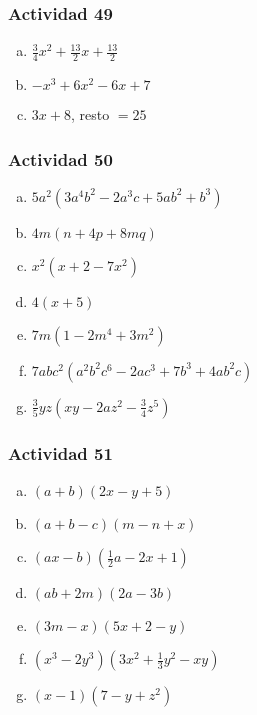 \documentclass[a4paper, twocolumn]{article}
\begin{document}
\subsubsection*{Actividad 49}
\begin{enumerate}[a)]
\item $\frac{3}{4}x^2 + \frac{13}{2}x+\frac{13}{2}$
\item $-x^3 + 6x^2 -6x +7$
\item $3x + 8$, resto $=25$
\end{enumerate}

\subsubsection*{Actividad 50}
\begin{enumerate}[a)]
\item $5 a^2 (3 a^4 b^2 - 2 a^3 c + 5 a b^2 + b^3)$
\item $4m(n+4p+8mq)$
\item $x^2(x+2-7x^2)$
\item $4(x+5)$
\item $7m(1-2m^4+3m^2)$
\item $7abc^2(a^2b^2c^6-2ac^3+7b^3+4ab^2c)$
\item $\frac{3}{5}yz(xy-2az^2-\frac{3}{4}z^5)$
\end{enumerate}

\subsubsection*{Actividad 51}
\begin{enumerate}[a)]

\item $(a+b)(2x-y+5)$
\item $(a+b-c)(m-n+x)$
\item $(ax-b)(\frac{1}{2}a-2x+1)$
\item $(ab+2m)(2a-3b)$
\item $(3m-x)(5x+2-y)$
\item $(x^3-2y^3)(3x^2+\frac{1}{3}y^2-xy)$
\item $(x-1)(7-y+z^2)$
\end{enumerate}
\end{document}
